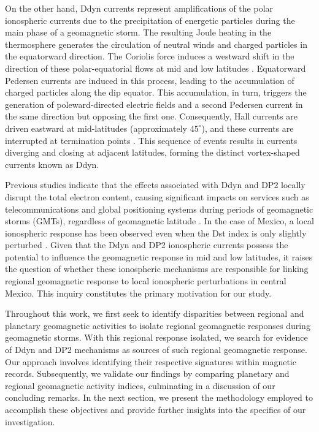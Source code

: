 \documentclass[a4paper,fleqn]{cas-dc}
\begin{document}
On the other hand, Ddyn currents represent amplifications of the polar ionospheric currents due to the precipitation of energetic particles during the main phase of a geomagnetic storm. The resulting Joule heating in the thermosphere generates the circulation of neutral winds and charged particles in the equatorward direction. The Coriolis force induces a westward shift in the direction of these polar-equatorial flows at mid and low latitudes \citep{blanc_ddyn, ddyn2005, angeoddyn}. Equatorward Pedersen currents are induced in this process, leading to the accumulation of charged particles along the dip equator. This accumulation, in turn, triggers the generation of poleward-directed electric fields and a second Pedersen current in the same direction but opposing the first one. Consequently, Hall currents are driven eastward at mid-latitudes (approximately $45^\circ$), and these currents are interrupted at termination points \citep{blanc_ddyn}. This sequence of events results in currents diverging and closing at adjacent latitudes, forming the distinct vortex-shaped currents known as Ddyn.

Previous studies indicate that the effects associated with Ddyn and DP2 locally disrupt the total electron content, causing significant impacts on services such as telecommunications and global positioning systems during periods of geomagnetic storms (GMTs), regardless of geomagnetic latitude \citep{mid-lat_ionocurrents,ionos1, signatures_of_eq_plasmabub}. In the case of Mexico, a local ionospheric response has been observed even when the Dst index is only slightly perturbed \citep{dramaria_1, dramaria7}. Given that the Ddyn and DP2 ionospheric currents possess the potential to influence the geomagnetic response in mid and low latitudes, it raises the question of whether these ionospheric mechanisms are responsible for linking regional geomagnetic response to local ionospheric perturbations in central Mexico. This inquiry constitutes the primary motivation for our study.

Throughout this work, we first seek to identify disparities between regional and planetary geomagnetic activities to isolate regional geomagnetic responses during geomagnetic storms. With this regional response isolated, we search for evidence of Ddyn and DP2 mechanisms as sources of such regional geomagnetic response. Our approach involves identifying their respective signatures within magnetic records. Subsequently, we validate our findings by comparing planetary and regional geomagnetic activity indices, culminating in a discussion of our concluding remarks. In the next section, we present the methodology employed to accomplish these objectives and provide further insights into the specifics of our investigation.
\end{document}
